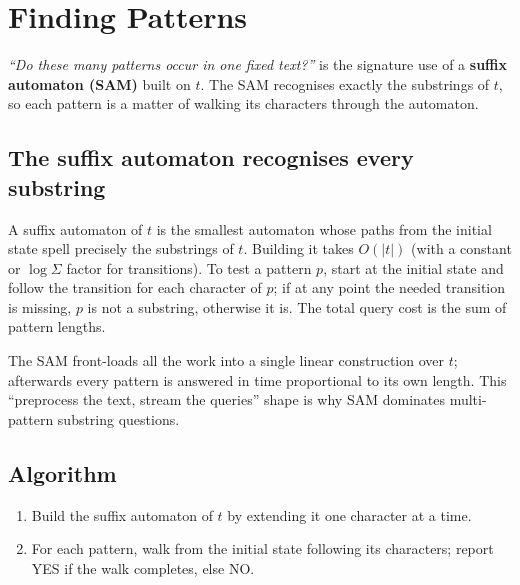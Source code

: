 \section{Finding Patterns}
\label{sec:cses-finding-patterns}


\begin{patternbox}
\emph{``Do these many patterns occur in one fixed text?''} is the
signature use of a \textbf{suffix automaton (SAM)} built on $t$. The SAM
recognises exactly the substrings of $t$, so each pattern is a matter of
walking its characters through the automaton.
\end{patternbox}

\subsection*{The suffix automaton recognises every substring}

A suffix automaton of $t$ is the smallest automaton whose paths from the
initial state spell precisely the substrings of $t$. Building it takes
$O(|t|)$ (with a constant or $\log\Sigma$ factor for transitions). To test
a pattern $p$, start at the initial state and follow the transition for
each character of $p$; if at any point the needed transition is missing,
$p$ is not a substring, otherwise it is. The total query cost is the sum
of pattern lengths.

\begin{ideabox}
The SAM front-loads all the work into a single linear construction over
$t$; afterwards every pattern is answered in time proportional to its own
length. This ``preprocess the text, stream the queries'' shape is why SAM
dominates multi-pattern substring questions.
\end{ideabox}

\subsection*{Algorithm}

\begin{enumerate}
  \item Build the suffix automaton of $t$ by extending it one character at
        a time.
  \item For each pattern, walk from the initial state following its
        characters; report YES if the walk completes, else NO.
\end{enumerate}

